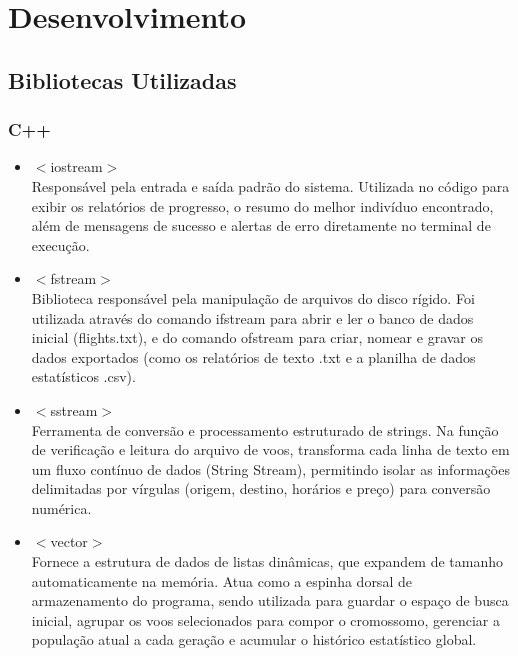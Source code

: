 \documentclass[conference]{IEEEtran}
\begin{document}

\section{Desenvolvimento}

\subsection{Bibliotecas Utilizadas}

\subsubsection{C++}

\begin{itemize}
	\item $<$iostream$>$ \\
	Responsável pela entrada e saída padrão do sistema. Utilizada no código para exibir os relatórios de progresso, o resumo do melhor indivíduo encontrado, além de mensagens de sucesso e alertas de erro diretamente no terminal de execução.
	
	\item $<$fstream$>$ \\
	Biblioteca responsável pela manipulação de arquivos do disco rígido. Foi utilizada através do comando ifstream para abrir e ler o banco de dados inicial (flights.txt), e do comando ofstream para criar, nomear e gravar os dados exportados (como os relatórios de texto .txt e a planilha de dados estatísticos .csv).
	
	\item $<$sstream$>$ \\
	Ferramenta de conversão e processamento estruturado de strings. Na função de verificação e leitura do arquivo de voos, transforma cada linha de texto em um fluxo contínuo de dados (String Stream), permitindo isolar as informações delimitadas por vírgulas (origem, destino, horários e preço) para conversão numérica.
	
	\item $<$vector$>$ \\
	Fornece a estrutura de dados de listas dinâmicas, que expandem de tamanho automaticamente na memória. Atua como a espinha dorsal de armazenamento do programa, sendo utilizada para guardar o espaço de busca inicial, agrupar os voos selecionados para compor o cromossomo, gerenciar a população atual a cada geração e acumular o histórico estatístico global.
	

\end{itemize}
\end{document}
